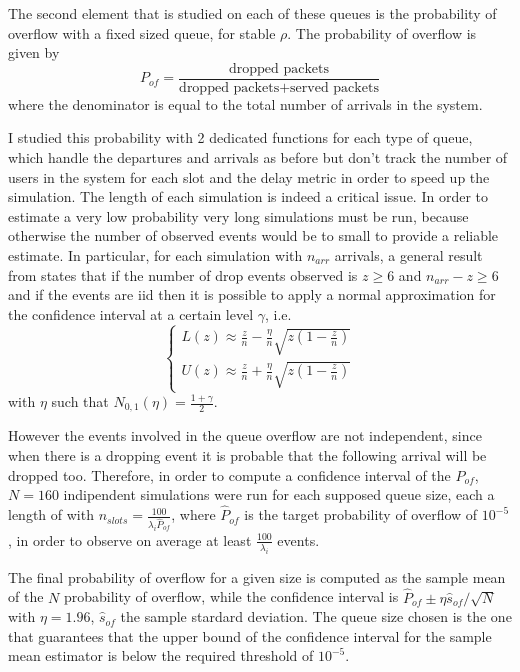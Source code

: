 \documentclass[10pt]{article}
\begin{document}
The second element that is studied on each of these queues is the probability of overflow with a fixed sized queue, for stable $\rho$. The probability of overflow is given by 
\begin{equation}
  P_{of} = \frac{\mbox{dropped packets}}{\mbox{dropped packets} + \mbox{served packets}}
\end{equation}
where the denominator is equal to the total number of arrivals in the system. 

I studied this probability with 2 dedicated functions for each type of queue, which handle the departures and arrivals as before but don't track the number of users in the system for each slot and the delay metric in order to speed up the simulation. The length of each simulation is indeed a critical issue. In order to estimate a very low probability very long simulations must be run, because otherwise the number of observed events would be to small to provide a reliable estimate. In particular, for each simulation with $n_{arr}$ arrivals, a general result from \cite{leb} states that if the number of drop events observed is $z \ge 6$ and $n_{arr} - z \ge 6$ and if the events are iid then it is possible to apply a normal approximation for the confidence interval at a certain level $\gamma$, i.e.
\begin{equation}
  \begin{cases}
  L(z) \approx \frac{z}{n} - \frac{\eta}{n}\sqrt{z\left(1 - \frac{z}{n}\right)} \\
  U(z) \approx \frac{z}{n} + \frac{\eta}{n}\sqrt{z\left(1 - \frac{z}{n}\right)}
  \end{cases}
\end{equation}
with $\eta$ such that $N_{0,1}(\eta) = \frac{1+\gamma}{2}$.

However the events involved in the queue overflow are not independent, since when there is a dropping event it is probable that the following arrival will be dropped too. Therefore, in order to compute a confidence interval of the $P_{of}$, $N = 160$ indipendent simulations were run for each supposed queue size, each a length of with $n_{slots} = \frac{100}{\lambda_i \hat{P}_{of}}$, where $\hat{P}_{of}$ is the target probability of overflow of $10^{-5}$, in order to observe on average at least $\frac{100}{\lambda_i}$ events. 

The final probability of overflow for a given size is computed as the sample mean of the $N$ probability of overflow, while the confidence interval is $\hat{P}_{of} \pm \eta \hat{s}_{of}/\sqrt{N}$ with $\eta = 1.96$, $\hat{s}_{of}$ the sample stardard deviation. The queue size chosen is the one that guarantees that the upper bound of the confidence interval for the sample mean estimator is below the required threshold of $10^{-5}$. 
\end{document}
